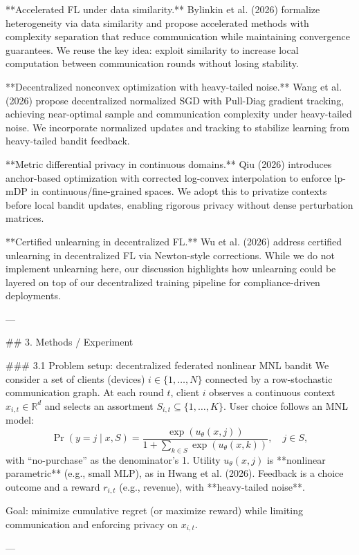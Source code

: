 **Accelerated FL under data similarity.** Bylinkin et al. (2026) formalize heterogeneity via data similarity and propose accelerated methods with complexity separation that reduce communication while maintaining convergence guarantees. We reuse the key idea: exploit similarity to increase local computation between communication rounds without losing stability.

**Decentralized nonconvex optimization with heavy-tailed noise.** Wang et al. (2026) propose decentralized normalized SGD with Pull-Diag gradient tracking, achieving near-optimal sample and communication complexity under heavy-tailed noise. We incorporate normalized updates and tracking to stabilize learning from heavy-tailed bandit feedback.

**Metric differential privacy in continuous domains.** Qiu (2026) introduces anchor-based optimization with corrected log-convex interpolation to enforce lp-mDP in continuous/fine-grained spaces. We adopt this to privatize contexts before local bandit updates, enabling rigorous privacy without dense perturbation matrices.

**Certified unlearning in decentralized FL.** Wu et al. (2026) address certified unlearning in decentralized FL via Newton-style corrections. While we do not implement unlearning here, our discussion highlights how unlearning could be layered on top of our decentralized training pipeline for compliance-driven deployments.

---

## 3. Methods / Experiment  

### 3.1 Problem setup: decentralized federated nonlinear MNL bandit  
We consider a set of clients (devices) \(i \in \{1,\dots,N\}\) connected by a row-stochastic communication graph. At each round \(t\), client \(i\) observes a continuous context \(x_{i,t}\in\mathbb{R}^d\) and selects an assortment \(S_{i,t}\subseteq\{1,\dots,K\}\). User choice follows an MNL model:
\[
\Pr(y=j \mid x, S) = \frac{\exp(u_\theta(x,j))}{1+\sum_{k\in S}\exp(u_\theta(x,k))}, \quad j\in S,
\]
with “no-purchase” as the denominator’s 1. Utility \(u_\theta(x,j)\) is **nonlinear parametric** (e.g., small MLP), as in Hwang et al. (2026). Feedback is a choice outcome and a reward \(r_{i,t}\) (e.g., revenue), with **heavy-tailed noise**.

Goal: minimize cumulative regret (or maximize reward) while limiting communication and enforcing privacy on \(x_{i,t}\).

---

